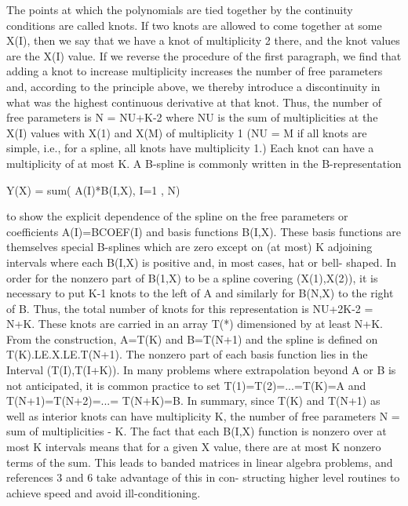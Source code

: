 \documentclass[11pt,twoside,nolof]{starlink}
\begin{document}
\begin{terminalv}
     The points at which the polynomials are tied together by the
     continuity conditions are called knots.  If two knots are
     allowed to come together at some X(I), then we say that we
     have a knot of multiplicity 2 there, and the knot values are
     the X(I) value.  If we reverse the procedure of the first
     paragraph, we find that adding a knot to increase multiplicity
     increases the number of free parameters and, according to the
     principle above, we thereby introduce a discontinuity in what
     was the highest continuous derivative at that knot.  Thus, the
     number of free parameters is N = NU+K-2 where NU is the sum
     of multiplicities at the X(I) values with X(1) and X(M) of
     multiplicity 1 (NU = M if all knots are simple, i.e., for a
     spline, all knots have multiplicity 1.)  Each knot can have a
     multiplicity of at most K.  A B-spline is commonly written in the
     B-representation

               Y(X) = sum( A(I)*B(I,X), I=1 , N)

     to show the explicit dependence of the spline on the free
     parameters or coefficients A(I)=BCOEF(I) and basis functions
     B(I,X).  These basis functions are themselves special B-splines
     which are zero except on (at most) K adjoining intervals where
     each B(I,X) is positive and, in most cases, hat or bell-
     shaped.  In order for the nonzero part of B(1,X) to be a spline
     covering (X(1),X(2)), it is necessary to put K-1 knots to the
     left of A and similarly for B(N,X) to the right of B.  Thus, the
     total number of knots for this representation is NU+2K-2 = N+K.
     These knots are carried in an array T(*) dimensioned by at least
     N+K.  From the construction, A=T(K) and B=T(N+1) and the spline is
     defined on T(K).LE.X.LE.T(N+1).  The nonzero part of each basis
     function lies in the  Interval (T(I),T(I+K)).  In many problems
     where extrapolation beyond A or B is not anticipated, it is common
     practice to set T(1)=T(2)=...=T(K)=A and T(N+1)=T(N+2)=...=
     T(N+K)=B.  In summary, since T(K) and T(N+1) as well as
     interior knots can have multiplicity K, the number of free
     parameters N = sum of multiplicities - K.  The fact that each
     B(I,X) function is nonzero over at most K intervals means that
     for a given X value, there are at most K nonzero terms of the
     sum.  This leads to banded matrices in linear algebra problems,
     and references 3 and 6 take advantage of this in con-
     structing higher level routines to achieve speed and avoid
     ill-conditioning.


\end{terminalv}
\end{document}
